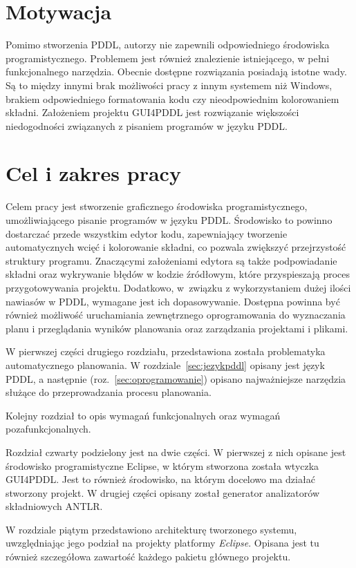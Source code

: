 \section{Motywacja}
Pomimo stworzenia PDDL, autorzy nie zapewnili odpowiedniego środowiska programistycznego. Problemem jest również znalezienie istniejącego, w pełni funkcjonalnego narzędzia. Obecnie dostępne rozwiązania posiadają istotne wady. Są to między innymi brak możliwości pracy z innym systemem  niż Windows, brakiem odpowiedniego formatowania kodu czy nieodpowiednim kolorowaniem składni. Założeniem projektu GUI4PDDL jest rozwiązanie większości niedogodności związanych z pisaniem programów w języku PDDL.
\section{Cel i zakres pracy}
Celem pracy jest stworzenie graficznego środowiska programistycznego, umożliwiającego pisanie programów w języku PDDL. Środowisko to powinno dostarczać przede wszystkim edytor kodu, zapewniający tworzenie automatycznych wcięć i kolorowanie składni, co pozwala zwiększyć przejrzystość struktury programu. Znaczącymi założeniami edytora są także podpowiadanie składni oraz wykrywanie błędów w kodzie źródłowym, które przyspieszają proces przygotowywania projektu. Dodatkowo, w~związku z wykorzystaniem dużej ilości nawiasów w PDDL, wymagane jest ich dopasowywanie. Dostępna powinna być również możliwość uruchamiania zewnętrznego oprogramowania do wyznaczania planu i przeglądania wyników planowania oraz zarządzania projektami i plikami.  

W pierwszej części drugiego rozdziału, przedstawiona została problematyka automatycznego planowania. W rozdziale~\ref{sec:jezykpddl} opisany jest język PDDL, a następnie (roz.~\ref{sec:oprogramowanie}) opisano najważniejsze narzędzia służące do przeprowadzania procesu planowania.

Kolejny rozdział to opis wymagań funkcjonalnych oraz wymagań pozafunkcjonalnych.

Rozdział czwarty podzielony jest na dwie części. W pierwszej z nich opisane jest środowisko programistyczne Eclipse, w którym stworzona została wtyczka GUI4PDDL. Jest to również środowisko, na którym docelowo ma działać stworzony projekt. W drugiej części opisany został generator analizatorów składniowych ANTLR.

W rozdziale piątym przedstawiono architekturę tworzonego systemu, uwzględniając jego podział na projekty platformy \emph{Eclipse}. Opisana jest tu również szczegółowa zawartość każdego pakietu głównego projektu.

